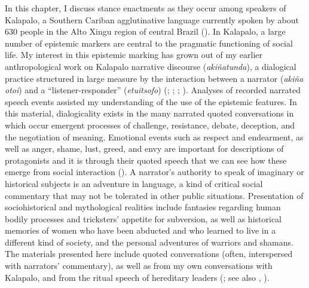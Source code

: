 \documentclass[output=paper]{langsci/langscibook}
\begin{document}
In this chapter, I discuss stance enactments as they occur among speakers of Kalapalo,  a Southern Cariban agglutinative language currently spoken by about 630 people in the Alto Xingu region of central Brazil (\citealt{Guerreiro2015}). In Kalapalo, a large number of epistemic markers are central to the pragmatic functioning of social life.  My interest in this  epistemic marking has grown out of my earlier anthropological work on Kalapalo narrative discourse (\textit{akiñatunda}), a dialogical practice structured in large measure by the interaction between a narrator (\textit{akiña otoi})  and a ``listener-responder'' (\textit{etuitsofo}) (\citealt{Basso1985}; \citeyear{Basso1986}; \citeyear{Basso1987}; \citeyear{Basso1995}). Analyses of recorded narrated speech events assisted my understanding of the use of the epistemic features.  In this material, dialogicality exists in the many narrated quoted conversations in which occur emergent processes of challenge, resistance, debate, deception, and the negotiation of meaning.  Emotional events such as respect and endearment, as well as anger, shame, lust, greed, and envy are important for descriptions of protagonists  and it is through their quoted speech that we can see how these emerge from social interaction (\citealt{Basso2007}).  A narrator’s authority to speak of imaginary or historical subjects is an adventure in language, a kind of critical social commentary that may not be tolerated in other public situations.  Presentation of sociohistorical and mythological realities include fantasies regarding human bodily processes and  tricksters’ appetite for subversion,  as well as historical memories of women who have been abducted and who learned to live in a different kind of society,  and the personal adventures of warriors and shamans.  The materials presented here include quoted conversations (often, interspersed with narrators’ commentary), as well as from my own conversations with Kalapalo, and from the ritual speech of hereditary leaders (\citealt{Basso2009}; see also \citealt{Franchetto1983}, \citeyear{Franchetto2000}).
 
\end{document}
